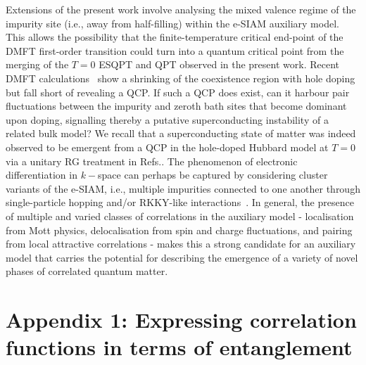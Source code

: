 Extensions of the present work involve analysing the mixed valence regime of the impurity site (i.e., away from half-filling) within the e-SIAM auxiliary model. This allows the possibility that the finite-temperature critical end-point of the DMFT first-order transition could turn into a quantum critical point from the merging of the $T=0$ ESQPT and QPT observed in the present work. Recent DMFT calculations~\cite{vucicevic2015} show a shrinking of the coexistence region with hole doping but fall short of revealing a QCP. If such a QCP does exist, can it harbour pair fluctuations between the impurity and zeroth bath sites that become dominant upon doping, signalling thereby a putative superconducting instability of a related bulk model? We recall that a superconducting state of matter was indeed observed to be emergent from a QCP in the hole-doped Hubbard model at $T=0$ via a unitary RG treatment in Refs.\cite{anirbanmott2,Mukherjee_mott_merg}.
The phenomenon of electronic differentiation in \(k-\)space can perhaps be captured by considering cluster variants of the e-SIAM, i.e., multiple impurities connected to one another through single-particle hopping and/or RKKY-like interactions~\cite{Ferrero2007,imada2010unconventional}.
In general, the presence of multiple and varied classes of correlations in the auxiliary model - localisation from Mott physics, delocalisation from spin and charge fluctuations, and pairing from local attractive correlations - makes this a strong candidate for an auxiliary model that carries the potential for describing the emergence of a variety of novel phases of correlated quantum matter.
\clearpage
\section*{Appendix 1: Expressing correlation functions in terms of entanglement}
\label{general-ent}

